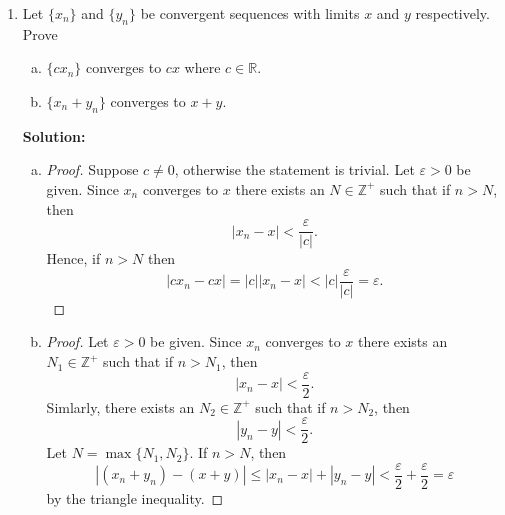 \documentclass[12pt,letterpaper]{article}
\theoremstyle{plain}
\theoremstyle{definition}
\begin{document}
\begin{enumerate}[1.]
\item Let $\{x_n\}$ and $\{y_n\}$ be convergent sequences with limits $x$ and $y$ respectively. Prove
\begin{enumerate}[(a)]
\item $\{cx_n\}$ converges to $cx$ where $c\in \mathbb{R}$.
\item $\{x_n+y_n\}$ converges to $x+y$. \\
\end{enumerate}
{\bf Solution:}
\begin{enumerate}[(a)]
\item 
\begin{proof}
Suppose $c\neq 0$, otherwise the statement is trivial. Let $\varepsilon>0$ be given.  Since $x_n$ converges to $x$ there exists an $N\in \mathbb{Z}^+$ such that if $n> N$, then 
\[|x_n-x|< \frac{\varepsilon}{|c|}.\] Hence, if $n>N$ then 
\[|cx_n-cx|=|c||x_n-x|< |c|\frac{\varepsilon}{|c|}=\varepsilon.\]
\end{proof}
\item 
\begin{proof} Let $\varepsilon >0$ be given. Since $x_n$ converges to $x$ there exists an $N_1\in \mathbb{Z}^+$ such that if $n> N_1$, then 
\[|x_n-x|<\frac{\varepsilon}{2}.\] Simlarly, there exists an $N_2\in \mathbb{Z}^+$ such that if $n> N_2$, then 
\[|y_n-y|<\frac{\varepsilon}{2}.\]
Let $N=\max\{N_1,N_2\}$. If $n>N$, then 
\[|(x_n+y_n)-(x+y)|\leq |x_n-x|+|y_n-y|< \frac{\varepsilon}{2}+\frac{\varepsilon}{2}=\varepsilon\]
by the triangle inequality. 
\end{proof} 


\end{enumerate}
\end{enumerate}
\end{document}
